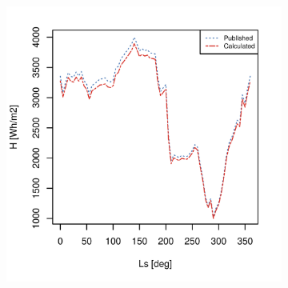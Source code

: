 \begin{figure}[h]
\captionsetup[subfigure]{justification=centering}
\vspace{-2ex}
\centering
    \setlength{\subfigureWidth}{0.50\textwidth}
    \setlength{\graphicsHeight}{60mm}
    \hypersetup{hidelinks=true}%
    \begin{subfigure}[t]{\subfigureWidth}
        \centering
            \includegraphics[height=\graphicsHeight]{sections/appendix/insolation-calculation-verification/plots/h-exp-calc-at-vl1-with-beta-223-deg.png}
            \label{fig:sub:comparative-global-insolation-at-vl1-beta-equals-phi-daily-variations}
    \end{subfigure}\hfill
    \begin{subfigure}[t]{\subfigureWidth}
        \centering

\end{subfigure}
\end{figure}
